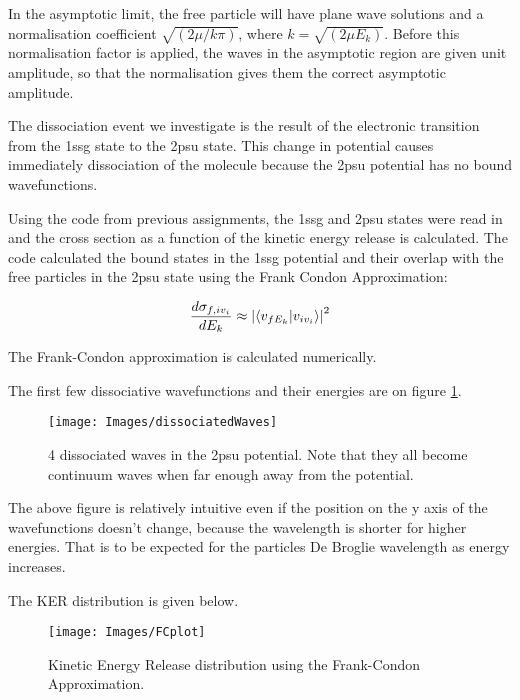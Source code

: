 \documentclass{article}
\begin{document}
    In the asymptotic limit, the free particle will have plane wave solutions and a normalisation coefficient $\sqrt{(2\mu/k\pi)}$, where $k=\sqrt{(2\mu E_k)}$. Before this normalisation factor is applied, the waves in the asymptotic region are given unit amplitude, so that the normalisation gives them the correct asymptotic amplitude.
   
    The dissociation event we investigate is the result of the electronic transition from the 1ssg state to the 2psu state. This change in potential causes immediately dissociation of the molecule because the 2psu potential has no bound wavefunctions. 
    
    Using the code from previous assignments, the 1ssg and 2psu states were read in and the cross section as a function of the kinetic energy release is calculated.
    The code calculated the bound states in the 1ssg potential and their overlap with the free particles in the 2psu state using the Frank Condon Approximation:
    
    \begin{gather}
    	\frac{d\sigma_{f,iv_i}}{dE_k} \approx \abs{\bra{v_{f E_k}}\ket{v_{iv_i}}}^2
    \end{gather}
    
    The Frank-Condon approximation is calculated numerically. 
    
    The first few dissociative wavefunctions and their energies are on figure \ref{dissociatedWaves}.
    
    \begin{figure}[H]
    	\centering
    	\texttt{[image: Images/dissociatedWaves]}
    	\caption{4 dissociated waves in the 2psu potential. Note that they all become continuum waves when far enough away from the potential.}
    	\label{dissociatedWaves}
    \end{figure}
    
    The above figure is relatively intuitive even if the position on the y axis of the wavefunctions doesn't change, because the wavelength is shorter for higher energies. That is to be expected for the particles De Broglie wavelength as energy increases.
    
    The KER distribution is given below.
    
    \begin{figure}[H]
    	\centering
    	\texttt{[image: Images/FCplot]}
    	\caption{Kinetic Energy Release distribution using the Frank-Condon Approximation.}
    	\label{KER}
    \end{figure}
	
\end{document}
